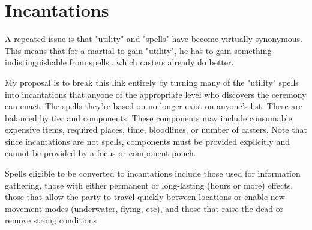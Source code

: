 \chapter{Incantations}\label{ch:incantations}
\begin{DndComment}
    A repeated issue is that "utility" and "spells" have become virtually synonymous. This means that for a martial to gain "utility", he has to gain something indistinguishable from spells...which casters already do better.

    My proposal is to break this link entirely by turning many of the "utility" spells into incantations that anyone of the appropriate level who discovers the ceremony can enact. The spells they're based on no longer exist on anyone's list. These are balanced by tier and components. These components may include consumable expensive items, required places, time, bloodlines, or number of casters. Note that since incantations are not spells, components must be provided explicitly and cannot be provided by a focus or component pouch.

    Spells eligible to be converted to incantations include those used for information gathering, those with either permanent or long-lasting (hours or more) effects, those that allow the party to travel quickly between locations or enable new movement modes (underwater, flying, etc), and those that raise the dead or remove strong conditions    
\end{DndComment}

